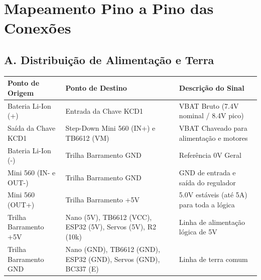 \documentclass[11pt,a4paper]{article}
\begin{document}
\newpage

\section{Mapeamento Pino a Pino das Conexões}

\subsection{A. Distribuição de Alimentação e Terra}
\begin{table}[h!]
\centering
\small
\begin{tabularx}{\textwidth}{p{4.5cm} p{5.5cm} X}
\toprule
\rowcolor{tablehead} \color{white}\textbf{Ponto de Origem} & \color{white}\textbf{Ponto de Destino} & \color{white}\textbf{Descrição do Sinal} \\
\midrule
Bateria Li-Ion (+) & Entrada da Chave KCD1 & VBAT Bruto (7.4V nominal / 8.4V pico) \\
\rowcolor{tablezebra} Saída da Chave KCD1 & Step-Down Mini 560 (IN+) e TB6612 (VM) & VBAT Chaveado para alimentação e motores \\
Bateria Li-Ion (-) & Trilha Barramento GND & Referência 0V Geral \\
\rowcolor{tablezebra} Mini 560 (IN- e OUT-) & Trilha Barramento GND & GND de entrada e saída do regulador \\
Mini 560 (OUT+) & Trilha Barramento +5V & 5.0V estáveis (até 5A) para toda a lógica \\
\rowcolor{tablezebra} Trilha Barramento +5V & Nano (5V), TB6612 (VCC), ESP32 (5V), Servos (5V), R2 (10k) & Linha de alimentação lógica de 5V \\
Trilha Barramento GND & Nano (GND), TB6612 (GND), ESP32 (GND), Servos (GND), BC337 (E) & Linha de terra comum \\
\bottomrule
\end{tabularx}
\end{table}
\end{document}

